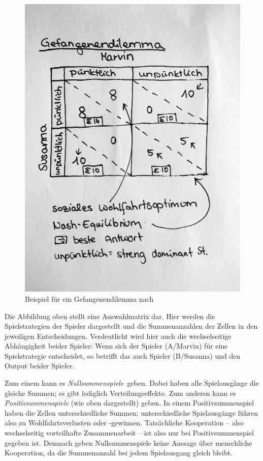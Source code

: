 {\begin{figure}[htbp]
	\begin{center}
	\includegraphics[width=1\textwidth]{img/gefangendilemma.jpg}
	\caption{Beispiel für ein Gefangenendilemma nach \cite{Kleinberg-2009-oz}}
	\label{fig:gefangenendilemma}
	\end{center}
\end{figure}

Die Abbildung oben stellt eine Auswahlmatrix dar.
Hier werden die Spielstrategien der Spieler dargestellt und die Summenanzahlen der Zellen in den jeweiligen Entscheidungen.
Verdeutlicht wird hier auch die wechselseitige Abhängigkeit beider Spieler: Wenn sich der Spieler (A/Marvin) für eine Spielstrategie entscheidet, so betrifft das auch Spieler (B/Susanna) und den Output beider Spieler.

Zum einem kann es \emph{Nullsummenspiele} geben.
Dabei haben alle Spielausgänge die gleiche Summen; es gibt lediglich Verteilungseffekte.
Zum anderen kann es \emph{Positivsummenspiele} (wie oben dargestellt) geben.
In einem Positivsummenspiel haben die Zellen unterschiedliche Summen; unterschiedliche Spielausgänge führen also zu Wohlfahrtsverlusten oder -gewinnen.
Tatsächliche Kooperation -- also wechselseitig vorteilhafte Zusammenarbeit -- ist also nur bei Positivsummenspiel gegeben ist.
Demnach geben Nullsummenspiele keine Aussage über menschliche Kooperation, da die Summenanzahl bei jedem Spielausgang gleich bleibt.

}
